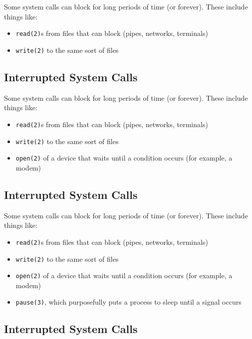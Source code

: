 \documentclass[xga]{xdvislides}
\begin{document}
Some system calls can block for long periods of time (or forever). These
include things like:

\begin{itemize}
	\item {\tt read(2)}s from files that can block (pipes, networks, terminals)
	\item {\tt write(2)} to the same sort of files
\end{itemize}

\subsection{Interrupted System Calls}

Some system calls can block for long periods of time (or forever). These
include things like:

\begin{itemize}
	\item {\tt read(2)}s from files that can block (pipes, networks, terminals)
	\item {\tt write(2)} to the same sort of files
	\item {\tt open(2)} of a device that waits until a condition occurs (for example, a modem)
\end{itemize}



\subsection{Interrupted System Calls}

Some system calls can block for long periods of time (or forever). These
include things like:

\begin{itemize}
	\item {\tt read(2)}s from files that can block (pipes, networks, terminals)
	\item {\tt write(2)} to the same sort of files
	\item {\tt open(2)} of a device that waits until a condition occurs (for example, a modem)
	\item {\tt pause(3)}, which purposefully puts a process to sleep until a signal occurs
\end{itemize}

\subsection{Interrupted System Calls}
\end{document}
